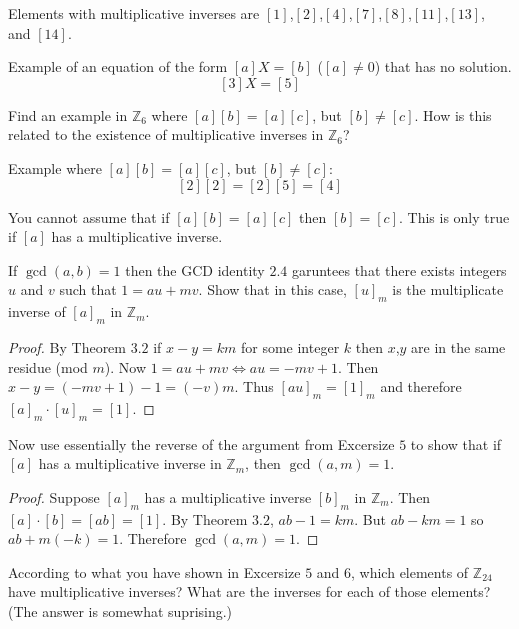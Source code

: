 \documentclass[8pt]{article}
\begin{document}
Elements with multiplicative inverses are $[1]$,$[2]$,$[4]$,$[7]$,$[8]$,$[11]$,$[13]$, and $[14]$.

Example of an equation of the form $[a]X = [b]$ ($[a] \not = 0$)
    that has no solution.
\[[3]X = [5]\]

\begin{tcolorbox}[title=Problem 4, breakable]
    Find an example in $\mathbb{Z}_6$ where $[a][b] = [a][c]$, but $[b] \not = [c]$.
    How is this related to the existence of  multiplicative inverses in $\mathbb{Z}_6$?
\end{tcolorbox}

Example where $[a][b] = [a][c]$, but $[b] \not = [c]$:
\[[2][2] = [2][5] = [4]\]

You cannot assume that if  $[a][b] = [a][c]$ then $[b] = [c]$.
This is only true if $[a]$ has a multiplicative inverse.

\begin{tcolorbox}[title=Problem 5, breakable]
    If $\gcd(a, b) = 1$ then the GCD identity $2.4$ garuntees that there exists 
    integers $u$ and $v$ such that $1 = au + mv$. Show that in this case, 
    $[u]_m$ is the multiplicate inverse of $[a]_m$ in $\mathbb{Z}_m$.
\end{tcolorbox}

\begin{proof}
    By Theorem $3.2$ if $x - y = km$ for some integer $k$ then $x$,$y$ are in the same residue (mod $m$).
    Now $1 = au + mv \iff au = -mv + 1$.
    Then $x - y = (-mv + 1) - 1 = (-v)m$.
    Thus ${[au]}_m = {[1]}_m$ and therefore $[a]_m \cdot [u]_m = [1]$.
\end{proof}

\begin{tcolorbox}[title=Problem 6, breakable]
    Now use essentially the reverse of the argument from Excersize $5$
    to show that if $[a]$ has a multiplicative inverse in $\mathbb{Z}_m$,
    then $\gcd(a, m) = 1$.
\end{tcolorbox}

\begin{proof}
    Suppose $[a]_m$ has a multiplicative inverse $[b]_m$ in $\mathbb{Z}_m$.
    Then $[a] \cdot [b] = [ab] = [1]$.
    By Theorem $3.2$, $ab - 1 = km$.
    But $ab - km = 1$ so $ab + m(-k) = 1$.
    Therefore $\gcd(a, m) = 1$.
\end{proof}

\begin{tcolorbox}[title=Problem 7, breakable]
    According to what you have shown in Excersize $5$ and $6$, which 
    elements of $\mathbb{Z}_{24}$ have multiplicative inverses?
    What are the inverses for each of those elements? (The answer is somewhat suprising.)
\end{tcolorbox}
\end{document}

